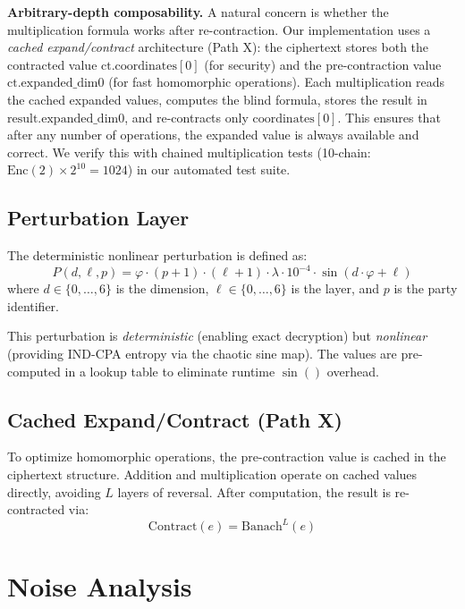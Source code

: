 \documentclass[11pt,a4paper]{article}
\begin{document}
\textbf{Arbitrary-depth composability.} A natural concern is whether the multiplication formula works after re-contraction. Our implementation uses a \textit{cached expand/contract} architecture (Path X): the ciphertext stores both the contracted value $\text{ct.coordinates}[0]$ (for security) and the pre-contraction value $\text{ct.expanded\_dim0}$ (for fast homomorphic operations). Each multiplication reads the cached expanded values, computes the blind formula, stores the result in $\text{result.expanded\_dim0}$, and re-contracts only $\text{coordinates}[0]$. This ensures that after any number of operations, the expanded value is always available and correct. We verify this with chained multiplication tests (10-chain: $\text{Enc}(2) \times 2^{10} = 1024$) in our automated test suite.

\subsection{Perturbation Layer}
\label{sec:perturbation}

The deterministic nonlinear perturbation is defined as:
\begin{equation}
    P(d, \ell, p) = \varphi \cdot (p+1) \cdot (\ell+1) \cdot \lambda \cdot 10^{-4} \cdot \sin(d \cdot \varphi + \ell)
\end{equation}
where $d \in \{0,\ldots,6\}$ is the dimension, $\ell \in \{0,\ldots,6\}$ is the layer, and $p$ is the party identifier.

This perturbation is \textit{deterministic} (enabling exact decryption) but \textit{nonlinear} (providing IND-CPA entropy via the chaotic sine map). The values are pre-computed in a lookup table to eliminate runtime $\sin()$ overhead.

\subsection{Cached Expand/Contract (Path X)}

To optimize homomorphic operations, the pre-contraction value is cached in the ciphertext structure. Addition and multiplication operate on cached values directly, avoiding $L$ layers of reversal. After computation, the result is re-contracted via:
\begin{equation}
    \text{Contract}(e) = \text{Banach}^L(e)
\end{equation}

\section{Noise Analysis}
\label{sec:noise}
\end{document}
